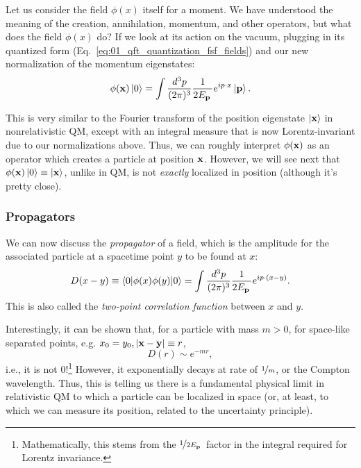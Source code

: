 Let us consider the field $\phi(x)$ itself for a moment.
We have understood the meaning of the creation, annihilation, momentum, and other operators, but what does the field $\phi(x)$ do?
If we look at its action on the vacuum, plugging in its quantized form (Eq.~\ref{eq:01_qft_quantization_fsf_fields}) and our new normalization of the momentum eigenstates:
\begin{equation}
    \label{eq:01_qft_quantization_field_vacuum}
    \phi(\mathbf{x})\ket{0} = \int \frac{d^3p}{(2\pi)^3} \frac{1}{2E_{\mathbf{p}}\,} e^{ip\cdot x}\ket{\mathbf{p}}.
\end{equation}

This is very similar to the Fourier transform of the position eigenstate $\ket{\mathbf{x}}$ in nonrelativistic QM, except with an integral measure that is now Lorentz-invariant due to our normalizations above.
Thus, we can roughly interpret $\phi(\mathbf{x})$ as an operator which creates a particle at position $\mathbf{x}$.
However, we will see next that $\phi(\mathbf{x})\ket{0} \equiv \ket{\mathbf{x}}$, unlike in QM, is not \textit{exactly} localized in position (although it's pretty close).


\subsubsection{Propagators} 

We can now discuss the \textit{propagator} of a field, which is the amplitude for the associated particle at a spacetime point $y$ to be found at $x$:
\begin{equation}
    \label{eq:01_qft_quantization_propagator}
    D(x - y) \equiv \braket{0|\phi(x)\phi(y)|0} = \int \frac{d^3p}{(2\pi)^3} \frac{1}{2E_{\mathbf{p}}\,} e^{ip\cdot (x - y)}.
\end{equation}
This is also called the \textit{two-point correlation function} between $x$ and $y$.

Interestingly, it can be shown that, for a particle with mass $m > 0$, for space-like separated points, e.g. $x_0 = y_0, \left\lvert \mathbf{x} - \mathbf{y} \right\rvert \equiv r$, 
\begin{equation}
	\label{eq:01_qft_quantization_propagator_spacelike}
	D(r) \sim e^{-mr},
\end{equation}
i.e., it is not 0!\footnote{Mathematically, this stems from the $\cnicefrac{1}{2\svecp E}$ factor in the integral required for Lorentz invariance.}
However, it exponentially decays at rate of $\cnicefrac{1}{m}$, or the Compton wavelength.
Thus, this is telling us there is a fundamental physical limit in relativistic QM to which a particle can be localized in space (or, at least, to which we can measure its position, related to the uncertainty principle).

